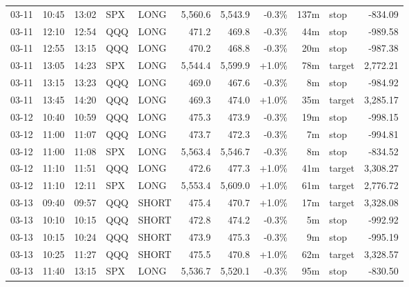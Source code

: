 \documentclass[11pt,a4paper,twoside]{article}
\begin{document}
\begin{center}
\begin{longtable}{>{\color{txtmain}}l l l l l r r r r >{\color{txtmain}}l r}
03-11 & 10:45 & 13:02 & SPX & LONG & 5,560.6 & 5,543.9 & \textcolor{lossred}{-0.3\%} & 137m & stop & \textcolor{lossred}{-834.09} \\
03-11 & 12:10 & 12:54 & QQQ & LONG & 471.2 & 469.8 & \textcolor{lossred}{-0.3\%} & 44m & stop & \textcolor{lossred}{-989.58} \\
03-11 & 12:55 & 13:15 & QQQ & LONG & 470.2 & 468.8 & \textcolor{lossred}{-0.3\%} & 20m & stop & \textcolor{lossred}{-987.38} \\
03-11 & 13:05 & 14:23 & SPX & LONG & 5,544.4 & 5,599.9 & \textcolor{wingreen}{+1.0\%} & 78m & target & \textcolor{wingreen}{2,772.21} \\
03-11 & 13:15 & 13:23 & QQQ & LONG & 469.0 & 467.6 & \textcolor{lossred}{-0.3\%} & 8m & stop & \textcolor{lossred}{-984.92} \\
03-11 & 13:45 & 14:20 & QQQ & LONG & 469.3 & 474.0 & \textcolor{wingreen}{+1.0\%} & 35m & target & \textcolor{wingreen}{3,285.17} \\
03-12 & 10:40 & 10:59 & QQQ & LONG & 475.3 & 473.9 & \textcolor{lossred}{-0.3\%} & 19m & stop & \textcolor{lossred}{-998.15} \\
03-12 & 11:00 & 11:07 & QQQ & LONG & 473.7 & 472.3 & \textcolor{lossred}{-0.3\%} & 7m & stop & \textcolor{lossred}{-994.81} \\
03-12 & 11:00 & 11:08 & SPX & LONG & 5,563.4 & 5,546.7 & \textcolor{lossred}{-0.3\%} & 8m & stop & \textcolor{lossred}{-834.52} \\
03-12 & 11:10 & 11:51 & QQQ & LONG & 472.6 & 477.3 & \textcolor{wingreen}{+1.0\%} & 41m & target & \textcolor{wingreen}{3,308.27} \\
03-12 & 11:10 & 12:11 & SPX & LONG & 5,553.4 & 5,609.0 & \textcolor{wingreen}{+1.0\%} & 61m & target & \textcolor{wingreen}{2,776.72} \\
03-13 & 09:40 & 09:57 & QQQ & SHORT & 475.4 & 470.7 & \textcolor{wingreen}{+1.0\%} & 17m & target & \textcolor{wingreen}{3,328.08} \\
03-13 & 10:10 & 10:15 & QQQ & SHORT & 472.8 & 474.2 & \textcolor{lossred}{-0.3\%} & 5m & stop & \textcolor{lossred}{-992.92} \\
03-13 & 10:15 & 10:24 & QQQ & SHORT & 473.9 & 475.3 & \textcolor{lossred}{-0.3\%} & 9m & stop & \textcolor{lossred}{-995.19} \\
03-13 & 10:25 & 11:27 & QQQ & SHORT & 475.5 & 470.8 & \textcolor{wingreen}{+1.0\%} & 62m & target & \textcolor{wingreen}{3,328.57} \\
03-13 & 11:40 & 13:15 & SPX & LONG & 5,536.7 & 5,520.1 & \textcolor{lossred}{-0.3\%} & 95m & stop & \textcolor{lossred}{-830.50} \\

\end{longtable}
\end{center}
\end{document}

